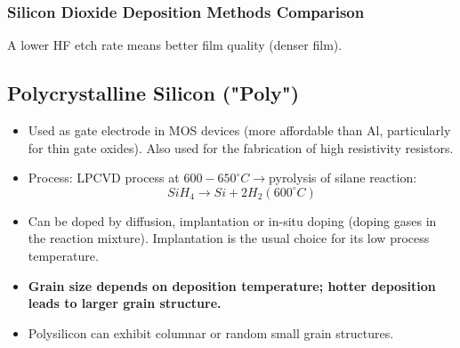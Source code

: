 \documentclass{report}
\begin{document}
\subsubsection{Silicon Dioxide Deposition Methods Comparison}
\begin{table}[h]
\centering
{}
\caption{Comparison of Silicon Dioxide Deposition Methods}
\end{table}
A lower HF etch rate means better film quality (denser film).

\subsection{Polycrystalline Silicon ("Poly")}
\begin{itemize}
    \item Used as gate electrode in MOS devices (more affordable than Al, particularly for thin gate oxides). Also used for the fabrication of high resistivity resistors.
    \item Process: LPCVD process at $600-650^{\circ}C \rightarrow$pyrolysis of silane reaction: $$SiH_{4}\rightarrow Si+2H_{2}(600^{\circ}C)$$
    \item Can be doped by diffusion, implantation or in-situ doping (doping gases in the reaction mixture). Implantation is the usual choice for its low process temperature.
    \item \textbf{Grain size depends on deposition temperature; hotter deposition leads to larger grain structure.}
    \item Polysilicon can exhibit columnar or random small grain structures.
\end{itemize}
\end{document}
